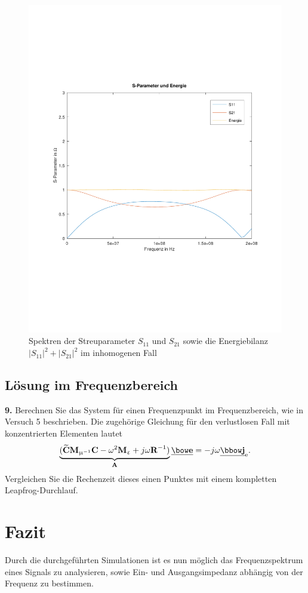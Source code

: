 \documentclass[Protokollheft.tex]{subfiles}
\begin{document}
\begin{figure}
	\centering
	\includegraphics[trim = 15mm 65mm 15mm 65mm, clip,width=0.7\linewidth]{inhomo_5}
	\caption{Spektren der Streuparameter $S_{11}$ und $S_{21}$ sowie die Energiebilanz $|S_{11}|^2 + |S_{21}|^2$ im inhomogenen Fall}
	\label{fig:inhomo_5}
\end{figure}

{\subsection{Lösung im Frequenzbereich}}

\begin{framed}
	\noindent \textbf{9.} Berechnen Sie das System für einen Frequenzpunkt im
Frequenzbereich, wie in Versuch 5 beschrieben. Die zugehörige
Gleichung für den verlustlosen Fall mit konzentrierten
Elementen lautet
\begin{equation}
	\underbrace{(\curldfit \Mmui \curlfit -
	\omega^2 \Meps + j \omega {\textbf{R}}^{-1} )}_{\Amat} \ul \efit = - j \omega \ul \jfit_{\text{e}}.
\end{equation}
Vergleichen Sie die Rechenzeit dieses einen Punktes mit einem
kompletten Leapfrog-Durchlauf.\label{exer:cmpFreqSolWithLeapfrog}
\end{framed}


\section{Fazit}
Durch die durchgeführten Simulationen ist es nun möglich das Frequenzspektrum eines Signals zu analysieren, sowie Ein- und Ausgangsimpedanz abhängig von der Frequenz zu bestimmen.
\end{document}
